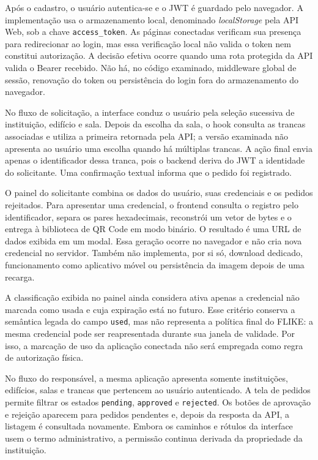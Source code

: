 Após o cadastro, o usuário autentica-se e o JWT é guardado pelo navegador. A implementação usa o armazenamento local, denominado \textit{localStorage} pela API Web, sob a chave \texttt{access\_token}. As páginas conectadas verificam sua presença para redirecionar ao login, mas essa verificação local não valida o token nem constitui autorização. A decisão efetiva ocorre quando uma rota protegida da API valida o Bearer recebido. Não há, no código examinado, middleware global de sessão, renovação do token ou persistência do login fora do armazenamento do navegador.

No fluxo de solicitação, a interface conduz o usuário pela seleção sucessiva de instituição, edifício e sala. Depois da escolha da sala, o hook consulta as trancas associadas e utiliza a primeira retornada pela API; a versão examinada não apresenta ao usuário uma escolha quando há múltiplas trancas. A ação final envia apenas o identificador dessa tranca, pois o backend deriva do JWT a identidade do solicitante. Uma confirmação textual informa que o pedido foi registrado.

O painel do solicitante combina os dados do usuário, suas credenciais e os pedidos rejeitados. Para apresentar uma credencial, o frontend consulta o registro pelo identificador, separa os pares hexadecimais, reconstrói um vetor de bytes e o entrega à biblioteca de QR Code em modo binário. O resultado é uma URL de dados exibida em um modal. Essa geração ocorre no navegador e não cria nova credencial no servidor. Também não implementa, por si só, download dedicado, funcionamento como aplicativo móvel ou persistência da imagem depois de uma recarga.

A classificação exibida no painel ainda considera ativa apenas a credencial não marcada como usada e cuja expiração está no futuro. Esse critério conserva a semântica legada do campo \texttt{used}, mas não representa a política final do FLIKE: a mesma credencial pode ser reapresentada durante sua janela de validade. Por isso, a marcação de uso da aplicação conectada não será empregada como regra de autorização física.

No fluxo do responsável, a mesma aplicação apresenta somente instituições, edifícios, salas e trancas que pertencem ao usuário autenticado. A tela de pedidos permite filtrar os estados \texttt{pending}, \texttt{approved} e \texttt{rejected}. Os botões de aprovação e rejeição aparecem para pedidos pendentes e, depois da resposta da API, a listagem é consultada novamente. Embora os caminhos e rótulos da interface usem o termo administrativo, a permissão continua derivada da propriedade da instituição.

